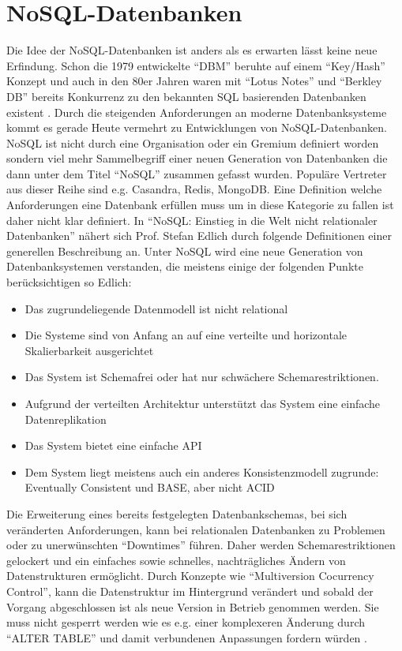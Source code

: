\documentclass[a4paper,11pt,oneside,%
headsepline,												%
footsepline,												%
bibtotocnumbered									%
]{scrreprt}
\begin{document}
\section{NoSQL-Datenbanken}
Die Idee der NoSQL-Datenbanken ist anders als es erwarten lässt keine neue Erfindung. Schon die 1979 entwickelte \enquote{DBM} beruhte auf einem \enquote{Key/Hash} Konzept und auch in den 80er Jahren waren mit \enquote{Lotus Notes} und \enquote{Berkley DB} bereits Konkurrenz zu den bekannten SQL basierenden Datenbanken existent \autocite[1]{Edlich2010}. Durch die steigenden Anforderungen an moderne Datenbanksysteme kommt es gerade Heute vermehrt zu Entwicklungen von NoSQL-Datenbanken. NoSQL ist nicht durch eine Organisation oder ein Gremium definiert worden sondern viel mehr Sammelbegriff einer neuen Generation von Datenbanken die dann unter dem Titel \enquote{NoSQL} zusammen gefasst wurden. Populäre Vertreter aus dieser Reihe sind e.g. Casandra, Redis, MongoDB. Eine Definition welche Anforderungen eine Datenbank erfüllen muss um in diese Kategorie zu fallen ist daher nicht klar definiert. In \enquote{NoSQL: Einstieg in die Welt nicht relationaler Datenbanken} nähert sich Prof. Stefan Edlich durch folgende Definitionen  einer generellen Beschreibung an. Unter NoSQL wird eine neue Generation von Datenbanksystemen verstanden, die meistens einige der folgenden Punkte berücksichtigen so Edlich\autocite[2]{Edlich2010}:
\begin{itemize}
		\item Das zugrundeliegende Datenmodell ist nicht relational
		\item Die Systeme sind von Anfang an auf eine verteilte und horizontale Skalierbarkeit ausgerichtet
		\item Das System ist Schemafrei oder hat nur schwächere Schemarestriktionen.
		\item Aufgrund der verteilten Architektur unterstützt das System eine einfache Datenreplikation
		\item Das System bietet eine einfache API
		\item Dem System liegt meistens auch ein anderes Konsistenzmodell zugrunde: Eventually Consistent und BASE, aber nicht ACID
\end{itemize}
Die Erweiterung eines bereits festgelegten Datenbankschemas, bei sich veränderten Anforderungen, kann bei relationalen Datenbanken zu Problemen oder zu unerwünschten \enquote{Downtimes} führen. Daher werden Schemarestriktionen gelockert und ein einfaches sowie schnelles, nachträgliches Ändern von Datenstrukturen ermöglicht. Durch Konzepte wie \enquote{Multiversion Cocurrency Control}, kann die Datenstruktur im Hintergrund verändert und sobald der Vorgang abgeschlossen ist als neue Version in Betrieb genommen werden. Sie muss nicht gesperrt werden wie es e.g. einer komplexeren Änderung durch \enquote{ALTER TABLE} und damit verbundenen Anpassungen fordern würden \autocite[3, 40]{Edlich2010}.\\
\end{document}
